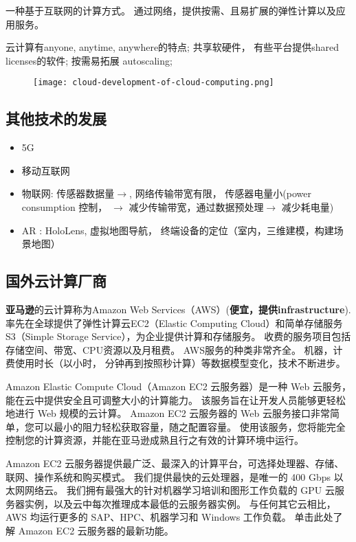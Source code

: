 \begin{definition}[云计算]
    一种基于互联网的计算方式。 通过网络，提供按需、且易扩展的弹性计算以及应用服务。 
\end{definition}

云计算有anyone, anytime, anywhere的特点; 共享软硬件， 有些平台提供shared licenses的软件; 按需易拓展 autoscaling; 

\begin{figure}[htbp]
    \centering
    \texttt{[image: cloud-development-of-cloud-computing.png]}
\end{figure}

\subsection{其他技术的发展}

\begin{itemize}
    \item 5G
    \item 移动互联网
    \item 物联网: 传感器数据量$\rightarrow$, 网络传输带宽有限， 传感器电量小(power consumption 控制，  $\rightarrow$ 减少传输带宽，通过数据预处理$\rightarrow$ 减少耗电量)
    \item AR : HoloLens, 虚拟地图导航， 终端设备的定位（室内，三维建模，构建场景地图）
\end{itemize}

\subsection{国外云计算厂商}

\textbf{亚马逊}的云计算称为Amazon Web Services（AWS）(\textbf{便宜，提供infrastructure}).率先在全球提供了弹性计算云EC2（Elastic Computing Cloud）和简单存储服务S3（Simple Storage Service），为企业提供计算和存储服务。 收费的服务项目包括存储空间、带宽、CPU资源以及月租费。 AWS服务的种类非常齐全。 
机器，计费使用时长（以小时， 分钟再到按照秒计算）等数据模型变化，技术不断进步。

\begin{definition}
    Amazon Elastic Compute Cloud（Amazon EC2 云服务器）是一种 Web 云服务，能在云中提供安全且可调整大小的计算能力。 该服务旨在让开发人员能够更轻松地进行 Web 规模的云计算。 Amazon EC2 云服务器的 Web 云服务接口非常简单，您可以最小的阻力轻松获取容量，随之配置容量。 使用该服务，您将能完全控制您的计算资源，并能在亚马逊成熟且行之有效的计算环境中运行。 

    Amazon EC2 云服务器提供最广泛、最深入的计算平台，可选择处理器、存储、联网、操作系统和购买模式。 我们提供最快的云处理器，是唯一的 400 Gbps 以太网网络云。 我们拥有最强大的针对机器学习培训和图形工作负载的 GPU 云服务器实例，以及云中每次推理成本最低的云服务器实例。 与任何其它云相比，AWS 均运行更多的 SAP、HPC、机器学习和 Windows 工作负载。 单击此处了解 Amazon EC2 云服务器的最新功能。 
\end{definition}

